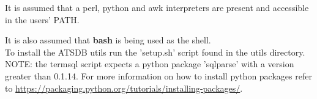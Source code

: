 It is assumed that a perl, python and awk interpreters are present and accessible in the users' PATH.

It is also assumed that \textbf{bash} is being used as the shell. \\

To install the ATSDB utils run the 'setup.sh' script found in the utils directory. \\

NOTE: the termsql script expects a python package 'sqlparse' with a version greater than 0.1.14. For more information on how to install python packages refer to \url{https://packaging.python.org/tutorials/installing-packages/}.
